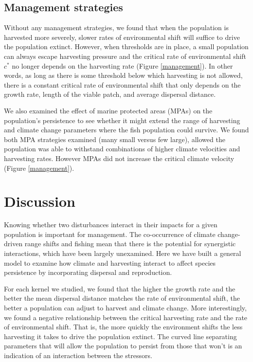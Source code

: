 \documentclass[12pt,english]{article}
\begin{document}
\begin{spacing}{1.9}
\begin{flushleft}
\subsection{Management strategies }

Without any management strategies, we found that when the population is harvested more severely, slower rates of environmental shift will suffice to drive the population extinct.  However, when thresholds are in place, a small population can always escape harvesting pressure and the critical rate of environmental shift $c^*$ no longer depends on the harvesting rate (Figure \ref{management}). In other words, as long as there is some threshold below which harvesting is not allowed, there is a constant critical rate of environmental shift that only depends on the growth rate, length of the viable patch, and average dispersal distance.  

We also examined the effect of marine protected  areas (MPAs) on the population's persistence to see whether it might extend the range of harvesting and  climate change parameters where the fish population could survive. We found both MPA strategies examined (many small versus few large), allowed the population was able to withstand combinations of higher climate velocities and harvesting rates. However MPAs did not increase the critical climate velocity (Figure \ref{management}).

\section{Discussion}

Knowing whether two disturbances interact in their impacts for a given population is important for management. The co-occurrence of climate change-driven range shifts and fishing mean that there is the potential for synergistic interactions, which have been largely unexamined.  Here we have built a general model to examine how climate and harvesting interact to affect species persistence by incorporating dispersal and reproduction. 

For each kernel we studied, we found that the higher the growth rate and the better the mean dispersal distance matches the rate of environmental shift, the better a population can adjust to harvest and climate change.  More interestingly, we found a negative relationship between the critical harvesting rate and the rate of environmental shift.  That is, the more quickly the environment shifts the less harvesting it takes to drive the population extinct.  The curved line separating parameters that will allow the population to persist from those that won't is an indication of an interaction between the stressors.


\end{flushleft}
\end{spacing}
\end{document}
